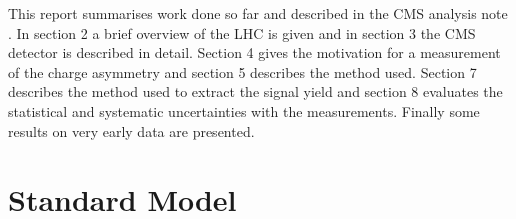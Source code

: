 This report summarises work done so far and described in the CMS analysis note
\cite{me}. 
In section 2 a brief overview of the LHC is given and in section 3 the CMS
detector is described in detail. 
Section 4 gives the motivation for a measurement of the charge asymmetry and
section 5 describes the method used. 
Section 7 describes the method used to extract the signal yield and section 8
evaluates the statistical and 
systematic uncertainties with the measurements. Finally some results on very
early data are presented.

\section{Standard Model}


